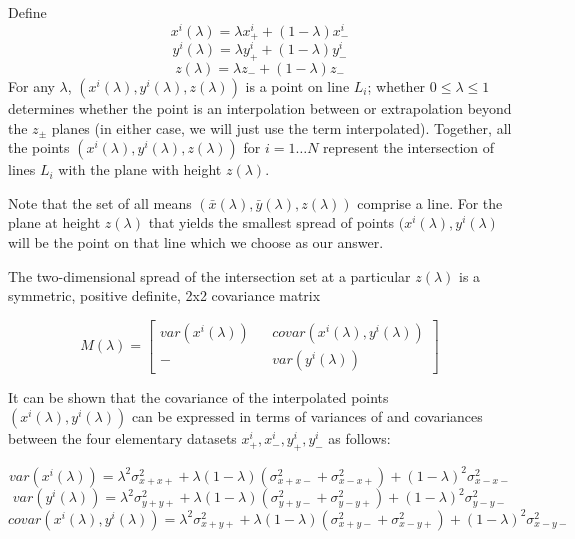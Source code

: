 \documentclass[11pt]{amsart}
\begin{document}
Define
$$x^i(\lambda) = \lambda x^i_+ + (1-\lambda) x^i_-$$
$$y^i(\lambda) = \lambda y^i_+ + (1-\lambda) y^i_-$$
$$z(\lambda) = \lambda z_- + (1-\lambda) z_-$$ For any $\lambda$,
$(x^i(\lambda), y^i(\lambda), z(\lambda))$ is a point on line $L_i$;
whether $0\le\lambda\le 1$ determines whether the point is an
interpolation between or extrapolation beyond the $z_\pm$ planes (in
either case, we will just use the term interpolated). Together, all
the points $(x^i(\lambda), y^i(\lambda), z(\lambda))$ for $i=1\ldots
N$ represent the intersection of lines $L_i$ with the plane with
height $z(\lambda)$.

Note that the set of all means
$(\bar{x}(\lambda),\bar{y}(\lambda),z(\lambda))$ comprise a line. For
the plane at height $z(\lambda)$ that yields the smallest spread of
points $(x^i(\lambda),y^i(\lambda)$ will be the point on that line
which we choose as our answer.

The two-dimensional spread of the intersection set at a particular
$z(\lambda)$ is a symmetric, positive definite, 2x2
covariance matrix

\[M(\lambda) =
\begin{bmatrix}
 var(x^i(\lambda)) && covar(x^i(\lambda),y^i(\lambda)) \\
  -                && var(y^i(\lambda))
\end{bmatrix}
\]

It can be shown that the covariance of the interpolated points
$(x^i(\lambda), y^i(\lambda))$ can be expressed in terms of variances of and
covariances between the four elementary datasets $x^i_+, x^i_-, y^i_+, y^i_-$ as
follows:

\begin{equation}\label{varx}
var(x^i(\lambda)) = \lambda^2\sigma^2_{x+x+} + \lambda(1-\lambda)(\sigma^2_{x+x-} + \sigma^2_{x-x+}) 
                + (1-\lambda)^2\sigma^2_{x-x-}
\end{equation}
\begin{equation}\label{vary}
var(y^i(\lambda)) = \lambda^2\sigma^2_{y+y+} + \lambda(1-\lambda)(\sigma^2_{y+y-} + \sigma^2_{y-y+}) 
                + (1-\lambda)^2\sigma^2_{y-y-}\end{equation}
\begin{equation}\label{covarxy}
covar(x^i(\lambda),y^i(\lambda)) = \lambda^2\sigma^2_{x+y+}  
                        + \lambda(1-\lambda)(\sigma^2_{x+y-} + \sigma^2_{x-y+}) 
                              + (1-\lambda)^2\sigma^2_{x-y-}
\end{equation}
\end{document}
